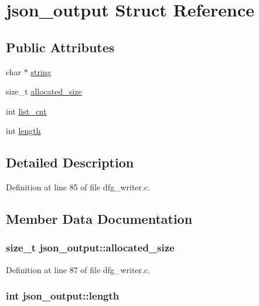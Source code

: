 \hypertarget{structjson__output}{\section{json\-\_\-output Struct Reference}
\label{structjson__output}
}
\subsection*{Public Attributes}
\begin{DoxyCompactItemize}
\item 
char $\ast$ \hyperlink{structjson__output_ab23f3314108564454074ebea87112800}{string}
\item 
size\-\_\-t \hyperlink{structjson__output_aecbcba21c9daa670feeaed052160ae88}{allocated\-\_\-size}
\item 
int \hyperlink{structjson__output_a848b0ad7bd9b43c68e4840546dd4af85}{list\-\_\-cnt}
\item 
int \hyperlink{structjson__output_a2bcea06742ddb91a63c5765a215aac6f}{length}
\end{DoxyCompactItemize}


\subsection{Detailed Description}


Definition at line 85 of file dfg\-\_\-writer.\-c.



\subsection{Member Data Documentation}
\hypertarget{structjson__output_aecbcba21c9daa670feeaed052160ae88}{
\subsubsection[{allocated\-\_\-size}]{\setlength{\rightskip}{0pt plus 5cm}size\-\_\-t json\-\_\-output\-::allocated\-\_\-size}}\label{structjson__output_aecbcba21c9daa670feeaed052160ae88}


Definition at line 87 of file dfg\-\_\-writer.\-c.

\hypertarget{structjson__output_a2bcea06742ddb91a63c5765a215aac6f}{
\subsubsection[{length}]{\setlength{\rightskip}{0pt plus 5cm}int json\-\_\-output\-::length}}\label{structjson__output_a2bcea06742ddb91a63c5765a215aac6f}


